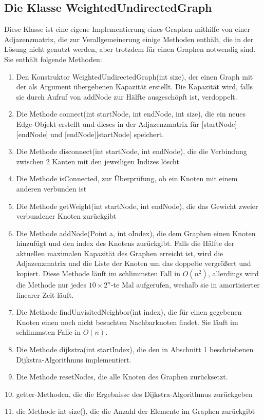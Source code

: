 \documentclass[a4paper,10pt,ngerman]{scrartcl}
\begin{document}
\subsection{Die Klasse WeightedUndirectedGraph}
Diese Klasse ist eine eigene Implementierung eines Graphen mithilfe von einer Adjazenzmatrix, die zur Verallgemeinerung einige Methoden enthält, die in der Lösung nicht genutzt werden, aber trotzdem für einen Graphen notwendig sind. Sie enthält folgende Methoden:
\begin{enumerate}
\item Den Konstruktor WeightedUndirectedGraph(int size), der einen Graph mit der als Argument übergebenen Kapazität erstellt. Die Kapazität wird, falls sie durch Aufruf von addNode zur Hälfte ausgeschöpft ist, verdoppelt.
\item Die Methode connect(int startNode, int endNode, int size), die ein neues Edge-Objekt erstellt und dieses in der Adjazenzmatrix für [startNode][endNode] und [endNode][startNode] speichert.
\item Die Methode disconnect(int startNode, int endNode), die die Verbindung zwischen 2 Kanten mit den jeweiligen Indizes löscht
\item Die Methode isConnected, zur Überprüfung, ob ein Knoten mit einem anderen verbunden ist
\item Die Methode getWeight(int startNode, int endNode), die das Gewicht zweier verbundener Knoten zurückgibt
\item Die Methode addNode(Point a, int oIndex), die dem Graphen einen Knoten hinzufügt und den index des Knotens zurückgibt. Falls die Hälfte der aktuellen maximalen Kapazität des Graphen erreicht ist, wird die Adjazenzmatrix und die Liste der Knoten um das doppelte vergrößert und kopiert. Diese Methode läuft im schlimmsten Fall in $O(n^2)$, allerdings wird die Methode nur jedes $10\times2^n$-te Mal aufgerufen, weshalb sie in amortisierter linearer Zeit läuft.
\item Die Methode findUnvisitedNeighbor(int index), die für einen gegebenen Knoten einen noch nicht besuchten Nachbarknoten findet. Sie läuft im schlimmsten Falle in $O(n)$.
\item Die Methode dijkstra(int startIndex), die den in Abschnitt 1 beschriebenen Dijkstra-Algorithmus implementiert.
\item Die Methode resetNodes, die alle Knoten des Graphen zurücksetzt.
\item getter-Methoden, die die Ergebnisse des Dijkstra-Algorithmus zurückgeben
\item die Methode int size(), die die Anzahl der Elemente im Graphen zurückgibt
\end{enumerate}
\end{document}
